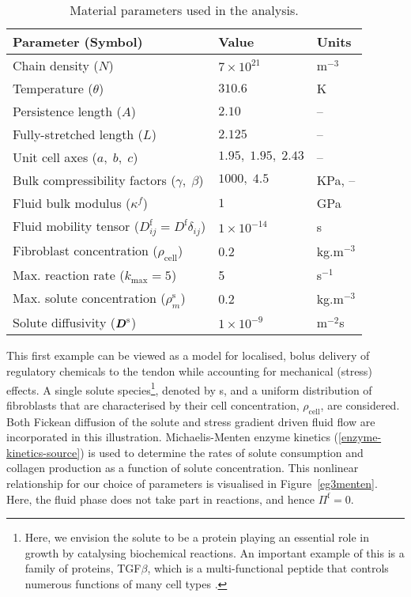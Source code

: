 \begin{table}
\centering
\begin{tabular}{|l|l|l|}
\hline Parameter (Symbol) & Value & Units\\ \hline \hline Chain
density ($N$) & $7\times 10^{21}$ & $\mathrm{m}^{-3}$\\ Temperature
($\theta$) & $310.6$ & K\\ Persistence length ($A$) & $2.10$ &
--\\ Fully-stretched length ($L$) & $2.125$ & --\\ Unit cell axes
($a,\;b,\;c$) & $1.95,\;1.95,\;2.43$ & --\\ Bulk compressibility
factors ($\gamma,\;\beta$) & $1000,\; 4.5$ & KPa, --\\ Fluid bulk modulus
($\kappa^f$) & $1$ & GPa\\ Fluid mobility tensor ($D^\mathrm{f}_{ij} =
D^\mathrm{f}\delta_{ij}$) & $1\times 10^{-14}$ &s\\ Fibroblast
concentration ($\rho_{\mathrm{cell}}$) & 0.2 &
kg.m$^{-3}$\\ Max. reaction rate ($k_{\mathrm{max}} = 5$) & 5 &
s$^{-1}$\\ Max. solute concentration ($\rho^{\mathrm{s}}_m$) & 0.2 &
kg.m$^{-3}$\\ Solute diffusivity ($\mbox{\boldmath$ D$}^\mathrm{s}$) & $1\times
10^{-9}$ & m$^{-2}$s\\ \hline
\end{tabular}
\caption{Material parameters used in the analysis.}
\label{parameters}
\end{table}

This first example can be viewed as a model for localised, bolus
delivery of regulatory chemicals to the tendon while accounting for
mechanical (stress) effects. A single solute species\footnote{Here, we
  envision the solute to be a protein playing an essential role in
  growth by catalysing biochemical reactions. An important example of
  this is a family of proteins, TGF$\beta$, which is a
  multi-functional peptide that controls numerous functions of many
  cell types \citep{Alberts:02}.}, denoted by s, and a uniform
distribution of fibroblasts that are characterised by their cell
concentration, $\rho_{\mathrm{cell}}$, are considered. Both Fickean
diffusion of the solute and stress gradient driven fluid flow are
incorporated in this illustration. Michaelis-Menten enzyme kinetics
(\ref{enzyme-kinetics-source}) is used to determine the rates of
solute consumption and collagen production as a function of solute
concentration. This nonlinear relationship for our choice of
parameters is visualised in Figure~\ref{eg3menten}. Here, the fluid
phase does not take part in reactions, and hence $\Pi^\mathrm{f}=0$.


